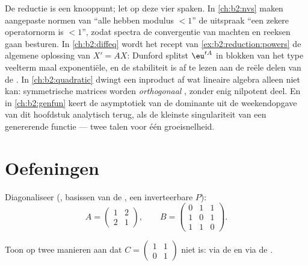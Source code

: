 \begin{remark}\label{rem:b2:reduction:perspectives}
De reductie is een knooppunt; let op deze vier spaken. In
\cref{ch:b2:nvs} maken aangepaste normen van ``alle 
hebben modulus $< 1$'' de uitspraak ``een zekere operatornorm is $<
1$'', zodat spectra de convergentie van machten en reeksen gaan
besturen. In \cref{ch:b2:diffeq} wordt het recept van
\cref{ex:b2:reduction:powers} de algemene oplossing van $X' = AX$:
Dunford splitst $\eu^{tA}$ in blokken van het type veelterm maal
exponentiële, en de stabiliteit is af te lezen aan de reële delen
van de . In \cref{ch:b2:quadratic} dwingt een
inproduct af wat lineaire algebra alleen niet kan: symmetrische
matrices worden \emph{orthogonaal} , zonder enig
nilpotent deel. En in \cref{ch:b2:genfun} keert de asymptotiek van
de dominante  uit de weekendopgave van dit hoofdstuk
analytisch terug, als de kleinste singulariteit van een genererende
functie --- twee talen voor één groeisnelheid.
\end{remark}

\section{Oefeningen}

\begin{exercise}[$\star$]\label{exo:b2:reduction:1}
Diagonaliseer (, basissen van de , een
inverteerbare $P$):
\[
A = \begin{pmatrix} 1 & 2\\ 2 & 1 \end{pmatrix},
\qquad
B = \begin{pmatrix} 0 & 1 & 1\\ 1 & 0 & 1\\ 1 & 1 & 0
\end{pmatrix}.
\]
\end{exercise}

\begin{exercise}[$\star$]\label{exo:b2:reduction:2}
Toon op twee manieren aan dat $C = \begin{pmatrix} 1 & 1\\ 0 &
1\end{pmatrix}$ niet  is: via de  en
via de .
\end{exercise}

